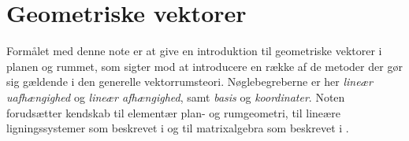 
\setcounter{chapter}{5} %


\chapter{Geometriske vektorer} \label{tn6}

\begin{basis}
Formålet med denne note er at give en introduktion til geometriske vektorer i planen og rummet, som sigter mod at introducere en række af de metoder der gør sig gældende i den generelle vektorrumsteori. Nøglebegreberne er her \textit{lineær uafhængighed} og \textit{lineær afhængighed}, samt \textit{basis} og \textit{koordinater}. Noten forudsætter kendskab til elementær plan- og rumgeometri, til lineære ligningssystemer som beskrevet i  og til matrixalgebra som beskrevet i .
\end{basis}

